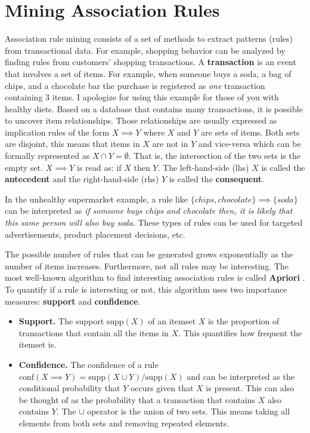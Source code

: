 \documentclass[
  11pt,
]{krantz}
\begin{document}
\hypertarget{associationrules}{%
\section{Mining Association Rules}\label{associationrules}}

Association rule mining consists of a set of methods to extract patterns (rules) from transactional data. For example, shopping behavior can be analyzed by finding rules from customers' shopping transactions. A \textbf{transaction} is an event that involves a set of items. For example, when someone buys a soda, a bag of chips, and a chocolate bar the purchase is registered as \emph{one} transaction containing \(3\) items. I apologize for using this example for those of you with healthy diets. Based on a database that contains many transactions, it is possible to uncover item relationships. Those relationships are usually expressed as implication rules of the form \(X \implies Y\) where \(X\) and \(Y\) are sets of items. Both sets are disjoint, this means that items in \(X\) are not in \(Y\) and vice-versa which can be formally represented as \(X \cap Y = \emptyset\). That is, the intersection of the two sets is the empty set. \(X \implies Y\) is read as: if \(X\) then \(Y\). The left-hand-side (lhs) \(X\) is called the \textbf{antecedent} and the right-hand-side (rhs) \(Y\) is called the \textbf{consequent}.

In the unhealthy supermarket example, a rule like \(\{chips, chocolate\} \implies \{soda\}\) can be interpreted as \emph{if someone buys chips and chocolate then, it is likely that this same person will also buy soda}. These types of rules can be used for targeted advertisements, product placement decisions, etc.

The possible number of rules that can be generated grows exponentially as the number of items increases. Furthermore, not all rules may be interesting. The most well-known algorithm to find interesting association rules is called \textbf{Apriori} \citep{agrawal1994}. To quantify if a rule is interesting or not, this algorithm uses two importance measures: \textbf{support} and \textbf{confidence}.

\begin{itemize}
\item
  \textbf{Support.} The support \(\text{supp}(X)\) of an itemset \(X\) is the proportion of transactions that contain all the items in \(X\). This quantifies how frequent the itemset is.
\item
  \textbf{Confidence.} The confidence of a rule \(\text{conf}(X \implies Y)=\text{supp}(X \cup Y)/\text{supp}(X)\) and can be interpreted as the conditional probability that \(Y\) occurs given that \(X\) is present. This can also be thought of as the probability that a transaction that contains \(X\) also contains \(Y\). The \(\cup\) operator is the union of two sets. This means taking all elements from both sets and removing repeated elements.
\end{itemize}
\end{document}
